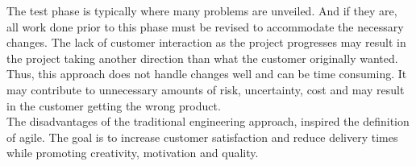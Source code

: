 The test phase is typically where many problems are unveiled. And if they are, all work done prior to this phase must be revised to accommodate the necessary changes. The lack of customer interaction as the project progresses may result in the project taking another direction than what the customer originally wanted. Thus, this approach does not handle changes well and can be time consuming. It may contribute to unnecessary amounts of risk, uncertainty, cost and may result in the customer getting the wrong product.\\ 

The disadvantages of the traditional engineering approach, inspired the definition of agile.
The goal is to increase customer satisfaction and reduce delivery times while promoting creativity, motivation and quality. 






